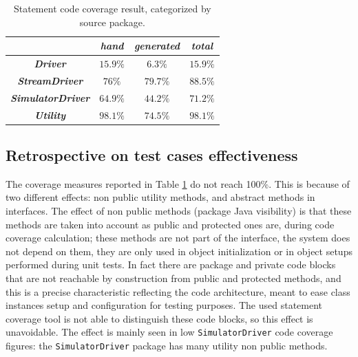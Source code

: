 \documentclass[english]{lni}
\newcommand{\lil}[1]{\texttt{\lstinline|#1|}}
\begin{document}
\begin{table}[htbp]
  \caption{Statement code coverage result, categorized by source package.}
  \label{tab:statement_code_coverage}
  \begin{center}
    \begin{tabular}{|c|c|c|c|}\hline
      & \textbf{\textit{hand}} & \textbf{\textit{generated}} &
      \textbf{\textit{total}} \\\hline
      \textbf{\textit{Driver}} & $15.9 \%$ & $6.3 \%$ & $15.9 \%$ \\\hline
      \textbf{\textit{StreamDriver}} & $76 \%$ & $79.7 \%$ & $88.5 \%$ \\\hline
      \textbf{\textit{SimulatorDriver}} & $64.9 \%$ & $44.2 \%$ &
      $71.2 \%$ \\\hline
      \textbf{\textit{Utility}} & $98.1 \%$ & $74.5 \%$ & $98.1 \%$ \\\hline
    \end{tabular}
  \end{center}
\end{table}



\subsection{Retrospective on test cases effectiveness}
\label{subsec:test_cases_retrospectives}

The coverage measures reported in Table \ref{tab:statement_code_coverage} do not reach 100\%. 
This is because of two different effects: non public utility methods, and abstract methods in interfaces.
The effect of non public methods (package Java visibility) is that these methods are taken into account as public and protected ones are, during code coverage calculation; these methods are not part of the interface, the system does not depend on them, they are only used in object initialization or in object setups performed during unit tests. 
In fact there are package and private code blocks that are not reachable by construction from public and protected methods, and this is a precise characteristic reflecting the code architecture, meant to ease class instances setup and configuration for testing purposes. 
The used statement coverage tool is not able to distinguish these code blocks, so this effect is unavoidable. 
The effect is mainly seen in low \lil{SimulatorDriver} code coverage figures: the \lil{SimulatorDriver} package has many utility non public methods.
\end{document}
